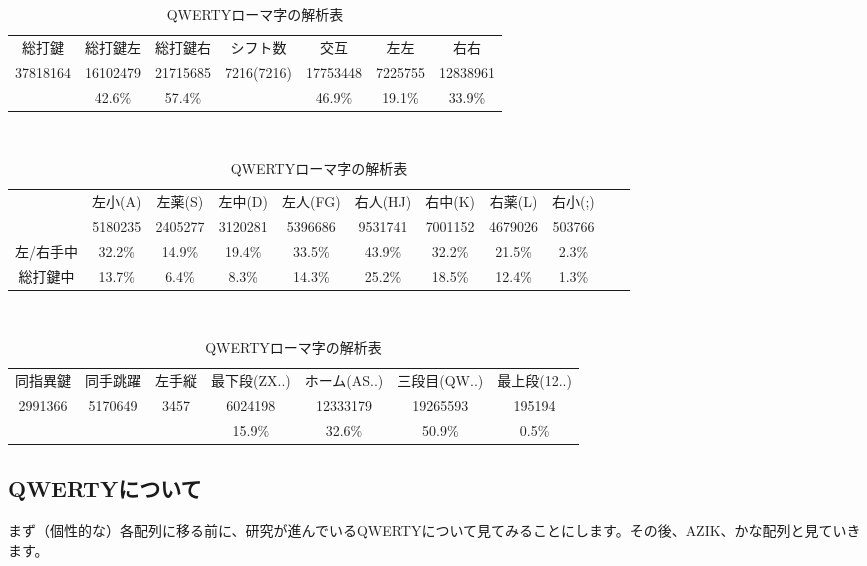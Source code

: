 \begin{table}[htbp]
 \caption{QWERTYローマ字の解析表}
 \begin{center}
 \begin{tabular}{cccc|ccc}
 \hline
総打鍵 & 総打鍵左 & 総打鍵右 & シフト数 & 交互 & 左左 & 右右 \\
37818164 & 16102479 & 21715685 & 7216(7216) & 17753448 & 7225755 & 12838961 \\
 & 42.6\% & 57.4\% & & 46.9\% & 19.1\% & 33.9\% \\
 \hline
 \end{tabular}

 　\vspace{1zw}　

 \begin{tabular}{ccccccccccc}
 \hline
& 左小(A) & 左薬(S) & 左中(D) & 左人(FG) & 右人(HJ) & 右中(K) & 右薬(L) & 右小(;)\\
& 5180235 & 2405277 & 3120281 & 5396686 & 9531741 & 7001152 & 4679026 & 503766\\
左/右手中 & 32.2\% & 14.9\% & 19.4\% & 33.5\% & 43.9\% & 32.2\% & 21.5\% & 2.3\%\\
総打鍵中 & 13.7\% & 6.4\% & 8.3\% & 14.3\% & 25.2\% & 18.5\% & 12.4\% & 1.3\%\\
\hline
 \end{tabular}

 　\vspace{1zw}　

 \begin{tabular}{ccc|cccc}
 \hline
 同指異鍵 & 同手跳躍 & 左手縦 & 最下段(ZX..) & ホーム(AS..) & 三段目(QW..) & 最上段(12..)\\
 2991366 & 5170649 & 3457 & 6024198 & 12333179 & 19265593 & 195194\\
  &  &  & 15.9\% & 32.6\% & 50.9\% & 0.5\%\\
\hline
 \end{tabular}
 \end{center}
 \label{tbl:roma_example}
\end{table}

\subsection{QWERTYについて}

まず（個性的な）各配列に移る前に、研究が進んでいるQWERTYについて見てみることにします。その後、AZIK、かな配列と見ていきます。

